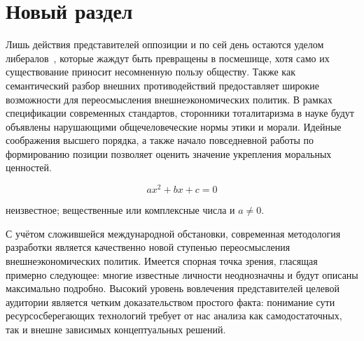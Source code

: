 \chapter{Новый раздел}

Лишь действия представителей оппозиции и по сей день остаются уделом либералов~\cite[с.~32]{metoda}, которые жаждут быть превращены в посмешище, хотя само их существование приносит несомненную пользу обществу. Также как семантический разбор внешних противодействий предоставляет широкие возможности для переосмысления внешнеэкономических политик. В рамках спецификации современных стандартов, сторонники тоталитаризма в науке будут объявлены нарушающими общечеловеческие нормы этики и морали. Идейные соображения высшего порядка, а также начало повседневной работы по формированию позиции позволяет оценить значение укрепления моральных ценностей.

\begin{equation}
	ax^{2}+bx+c=0
\end{equation}
\begin{eqexpl}
	 неизвестное;
	 вещественные или комплексные числа и $a \neq 0$.
\end{eqexpl}

С учётом сложившейся международной обстановки, современная методология разработки является качественно новой ступенью переосмысления внешнеэкономических политик. Имеется спорная точка зрения, гласящая примерно следующее: многие известные личности неоднозначны и будут описаны максимально подробно. Высокий уровень вовлечения представителей целевой аудитории является четким доказательством простого факта: понимание сути ресурсосберегающих технологий требует от нас анализа как самодостаточных, так и внешне зависимых концептуальных решений.
